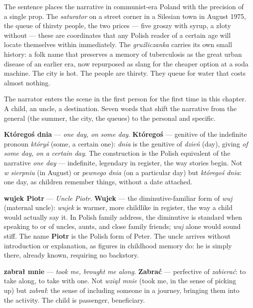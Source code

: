 \medskip
The sentence places the narrative in communist-era
Poland with the precision of a single prop. The
\textit{saturator} on a street corner in a Silesian
town in August 1975, the queue of thirsty people,
the two prices --- five groszy with syrup,
a złoty without --- these are coordinates that
any Polish reader of a certain age will locate
themselves within immediately. The \textit{gruźliczanka}
carries its own small history: a folk name that
preserves a memory of tuberculosis as the great
urban disease of an earlier era, now repurposed
as slang for the cheaper option at a soda machine.
The city is hot. The people are thirsty. They
queue for water that costs almost nothing.



The narrator enters the scene in the first person for
the first time in this chapter. A child, an uncle, a
destination. Seven words that shift the narrative from
the general (the summer, the city, the queues) to the
personal and specific.

\textbf{Któregoś dnia} --- \textit{one day, on some
day}. \textbf{Któregoś} --- genitive of the indefinite
pronoun \textit{któryś} (some, a certain one):
\textit{dnia} is the genitive of \textit{dzień} (day),
giving \textit{of some day, on a certain day}. The
construction is the Polish equivalent of the narrative
\textit{one day} --- indefinite, legendary in register,
the way stories begin. Not \textit{w sierpniu} (in
August) or \textit{pewnego dnia} (on a particular day)
but \textit{któregoś dnia}: one day, as children
remember things, without a date attached.

\textbf{wujek Piotr} --- \textit{Uncle Piotr}.
\textbf{Wujek} --- the diminutive-familiar form of
\textit{wuj} (maternal uncle): \textit{wujek} is
warmer, more childlike in register, the way a child
would actually say it. In Polish family address, the
diminutive is standard when speaking to or of uncles,
aunts, and close family friends; \textit{wuj} alone
would sound stiff. The name \textbf{Piotr} is the
Polish form of Peter. The uncle arrives without
introduction or explanation, as figures in childhood
memory do: he is simply there, already known,
requiring no backstory.

\textbf{zabrał mnie} --- \textit{took me, brought me
along}. \textbf{Zabrać} --- perfective of
\textit{zabierać}: to take along, to take with one.
Not \textit{wziął mnie} (took me, in the sense of
picking up) but \textit{zabrał}: the sense of
including someone in a journey, bringing them
into the activity. The child is passenger, beneficiary.

